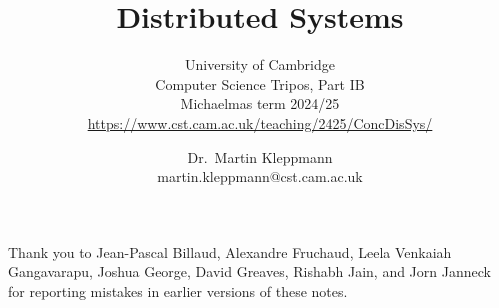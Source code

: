 \newcommand{\coursepath}{/teaching/2425/ConcDisSys/}
\newcommand{\courseurl}{\url{https://www.cst.cam.ac.uk\coursepath}}
\newcommand{\thisyear}{2024/25}
\newcommand{\timestampexample}{2021-11-09T09:50:17+00:00}
\newcommand{\whenissecurity}{Part IB Easter term}
\newcommand{\whenisnetworking}{Part IB Lent term}
\newcommand{\networking}{https://www.cl.cam.ac.uk/teaching/2425/CompNet/}
\newcommand{\security}{https://www.cl.cam.ac.uk/teaching/2425/CySecurity/}
\newcommand{\ledgersystems}{https://www.cl.cam.ac.uk/teaching/2425/R47/}
\newcommand{\multicore}{https://www.cl.cam.ac.uk/teaching/2425/L304/}

\newcommand{\mydetails}{%
    Dr.\ Martin Kleppmann\\
    martin.kleppmann@cst.cam.ac.uk\\[1em]
    University of Cambridge\\
    Computer Science Tripos, Part IB%
}



\title{Distributed Systems}
\subtitle{University of Cambridge\\%
Computer Science Tripos, Part IB\\%
Michaelmas term \thisyear\\%
\courseurl}

\author{Dr.\ Martin Kleppmann\\martin.kleppmann@cst.cam.ac.uk}
\date{}
\maketitle
\tableofcontents

\vspace{10pt}\noindent Thank you to Jean-Pascal Billaud, Alexandre Fruchaud, Leela Venkaiah Gangavarapu, Joshua George, David Greaves, Rishabh Jain, and Jorn Janneck for reporting mistakes in earlier versions of these notes.

\def\sectionautorefname{Section}%
\def\subsectionautorefname{Section}%
\def\subsubsectionautorefname{Section}%

